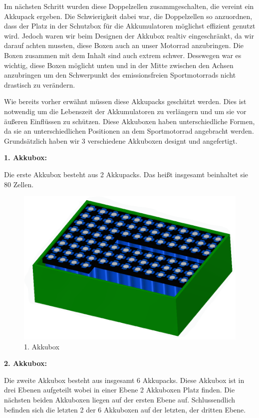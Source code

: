 Im nächsten Schritt wurden diese Doppelzellen zusammgeschalten, die vereint ein Akkupack ergeben. Die Schwierigkeit dabei war, die Doppelzellen so anzuordnen, dass der Platz in der Schutzbox für die Akkumulatoren möglichst effizient genutzt wird. Jedoch waren wir beim Designen der Akkubox realtiv eingeschränkt, da wir darauf achten mussten, diese Boxen auch an unser Motorrad anzubringen. Die Boxen zusammen mit dem Inhalt sind auch extrem schwer. Desswegen war es wichtig, diese Boxen möglicht unten und in der Mitte zwischen den Achsen anzubringen um den Schwerpunkt des emissionsfreien Sportmotorrads nicht drastisch zu verändern.

Wie bereits vorher erwähnt müssen diese Akkupacks geschützt werden. Dies ist notwendig um die Lebenszeit der Akkumulatoren zu verlängern und um sie vor äußeren Einflüssen zu schützen. Diese Akkuboxen haben unterschiedliche Formen, da sie an unterschiedlichen Positionen an dem Sportmotorrad angebracht werden. Grundsätzlich haben wir 3 verschiedene Akkuboxen designt und angefertigt.
\newpage

\textbf{1. Akkubox:}

Die erste Akkubox besteht aus 2 Akkupacks. Das heißt insgesamt beinhaltet sie 80 Zellen.

\begin{figure}[H]
	\begin{center}
		\includegraphics[scale=0.5]{figures/Akku/Akkubox1.PNG}
		\caption{1. Akkubox}
		\label{fig: 1. Akkubox}
	\end{center}
\end{figure}

\textbf{2. Akkubox:}

Die zweite Akkubox besteht aus insgesamt 6 Akkupacks. Diese Akkubox ist in drei Ebenen aufgeteilt wobei in einer Ebene 2 Akkuboxen Platz finden. Die nächsten beiden Akkuboxen liegen auf der ersten Ebene auf. Schlussendlich befinden sich die letzten 2 der 6 Akkuboxen auf der letzten, der dritten Ebene.



